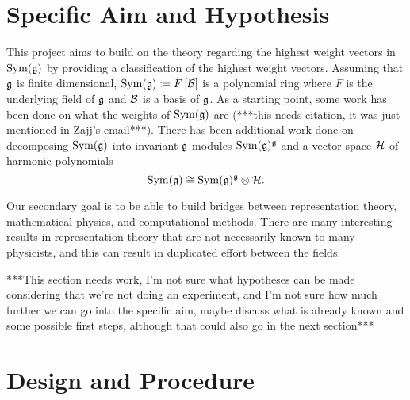 \documentclass[11pt, reqno]{amsart}
\begin{document}

\section{Specific Aim and Hypothesis}

This project aims to build on the theory regarding the highest weight vectors in $\operatorname{Sym}(\mathfrak{g})$ by providing a classification of the highest weight vectors. Assuming that $\mathfrak{g}$ is finite dimensional, $\operatorname{Sym}(\mathfrak{g})\coloneqq F\left[ \mathcal{B} \right]$ is a polynomial ring where $F$ is the underlying field of $\mathfrak{g}$ and $\mathcal{B}$ is a basis of $\mathfrak{g}$. As a starting point, some work has been done on what the weights of $\operatorname{Sym}(\mathfrak{g})$ are (***this needs citation, it was just mentioned in Zajj's email***). There has been additional work done on decomposing $\operatorname{Sym}(\mathfrak{g})$ into invariant $\mathfrak{g}$-modules $\operatorname{Sym}(\mathfrak{g})^{\mathfrak{g}}$ and a vector space $\mathcal{H}$ of harmonic polynomials \cite[(3.10)]{NeRa2004}
\[\operatorname{Sym}(\mathfrak{g})\cong\operatorname{Sym}(\mathfrak{g})^{\mathfrak{g}}\otimes\mathcal{H}.\] 

Our secondary goal is to be able to build bridges between representation theory, mathematical physics, and computational methods. There are many interesting results in representation theory that are not necessarily known to many physicists, and this can result in duplicated effort between the fields.




***This section needs work, I'm not sure what hypotheses can be made considering that we're not doing an experiment, and I'm not sure how much further we can go into the specific aim, maybe discuss what is already known and some possible first steps, although that could also go in the next section***

\section{Design and Procedure}
\end{document}
